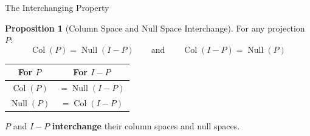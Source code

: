 \documentclass[10pt]{beamer}
\theoremstyle{definition}
\newtheorem{prop}{Proposition}[section]
\newcommand{\x}[1]{\alert{\textbf{#1}}}
\begin{document}
\begin{frame}{The Interchanging Property}

\begin{prop}[Column Space and Null Space Interchange]
For any projection $P$:
$$\operatorname{Col}(P) = \operatorname{Null}(I - P) \qquad\text{and}\qquad \operatorname{Col}(I - P) = \operatorname{Null}(P)$$
\end{prop}

\vspace{0.5em}

\begin{center}
\begin{tabular}{c|c}
\textbf{For $P$} & \textbf{For $I - P$} \\
\hline
$\operatorname{Col}(P)$ & $= \operatorname{Null}(I - P)$ \\
$\operatorname{Null}(P)$ & $= \operatorname{Col}(I - P)$ \\
\end{tabular}
\end{center}

\vspace{0.5em}

$P$ and $I - P$ \x{interchange} their column spaces and null spaces.

\end{frame}

%
%
%
\end{document}
